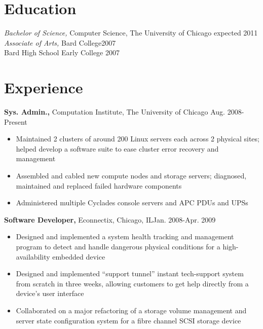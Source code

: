 \documentclass[line,overlapped]{res}
\begin{document}
 
 
 
\address{jalewis@uchicago.edu \hspace{1.6in} Current: 1151 E. 61th St. Apt. 1E, Chicago, IL 60637}
\address{(917) 974-7144 \hspace{2.18in} Permananent: 6 Warren Place, Brooklyn, NY 11201}

 
\newsectionwidth{.2in}
\begin{resume} 
 
\section{Education} 
{\sl Bachelor of Science,} Computer Science, The University of Chicago \hfill expected 2011\\
{\sl Associate of Arts,} Bard College\hfill 2007\\
Bard High School Early College \hfill 2007

\section{Experience}
{\bf Sys. Admin.,} Computation Institute, The University of Chicago \hfill Aug. 2008-Present
\begin{itemize} \itemsep -2pt %
    \item Maintained 2 clusters of around 200 Linux servers each across 2 physical sites; helped develop a software suite to ease cluster error recovery and management
    \item Assembled and cabled new compute nodes and storage servers; diagnosed, maintained and replaced failed hardware components
    \item Administered multiple Cyclades console servers and APC PDUs and UPSs
\end{itemize}

{\bf Software Developer,} Econnectix, Chicago, IL\hfill Jan. 2008-Apr. 2009
\begin{itemize} \itemsep -2pt %
    \item Designed and implemented a system health tracking and management program to detect and handle dangerous physical conditions for a high-availability embedded device
    \item Designed and implemented ``support tunnel'' instant tech-support system from scratch in three weeks, allowing customers to get help directly from a device's user interface
    \item Collaborated on a major refactoring of a storage volume management and server state configuration system for a fibre channel SCSI storage device
\end{itemize}


\end{resume}
\end{document}
